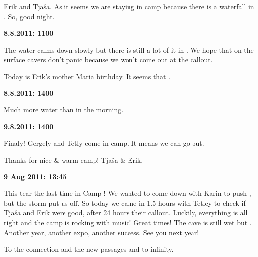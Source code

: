 Erik and Tjaša. As it seems we are staying in camp because there is a
waterfall in . So, good night.


\textbf{8.8.2011: 1100}

The water calms down slowly but there is still a lot of it in . We
hope that on the surface cavers don't panic because we won't come out at
the callout.

Today is Erik's mother Maria birthday. It seems that .


\textbf{8.8.2011: 1400}

Much more water than in the morning.


\textbf{9.8.2011: 1400} 

Finaly! Gergely and Tetly come in camp. It means we can go out.

Thanks for nice \& warm camp! Tjaša \& Erik.


\textbf{9 Aug 2011: 13:45}

This tear the last time in Camp ! We wanted to come down
with Karin to push , but the storm put us off. So today we came
in 1.5 hours with Tetley to check if Tjaša and Erik were good, after 24
hours their callout. Luckily, everything is all right and the camp is
rocking with music! Great times! The cave is still wet but . Another year, another expo, another success. See you next year!

To the connection and the new passages and to infinity.


